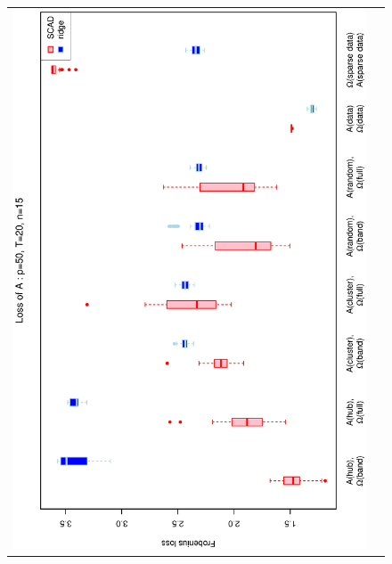 \documentclass[a4paper]{article}
\begin{document}
\begin{figure}[h!]
\centering
\begin{tabular}{cc}
\includegraphics[scale=0.5,angle=270]{LossA50T20N15.eps}\\

\end{tabular}
\end{figure}
\end{document}
